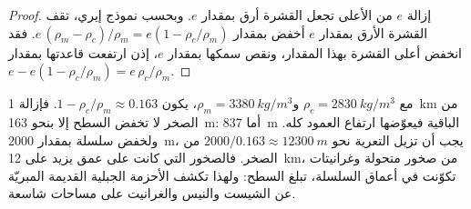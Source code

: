 \begin{proof}
إزالة $e$ من الأعلى تجعل القشرة أرق بمقدار $e$. وبحسب نموذج إيري،
تقف القشرة الأرق بمقدار $e$ أخفض بمقدار $e\,(\rho_m - \rho_c)/\rho_m = e(1 -
\rho_c/\rho_m)$. فقد انخفض أعلى القشرة بهذا المقدار، ونقص
سمكها بمقدار $e$، إذن ارتفعت قاعدتها بمقدار $e - e(1 -
\rho_c/\rho_m) = e\,\rho_c/\rho_m$.
\end{proof}
مع $\rho_c = \qty{2830}{kg/m^3}$ و$\rho_m = \qty{3380}{kg/m^3}$، يكون $1 -
\rho_c/\rho_m \approx 0.163$. فإزالة \qty{1}{km} من الصخر لا تخفض
السطح إلا بنحو \qty{163}{m}: أما \qty{837}{m} الباقية فيعوّضها
ارتفاع العمود كله.
ولخفض سلسلة بمقدار \qty{2000}{m}، يجب أن تزيل التعرية
نحو $2000/0.163 \approx \qty{12300}{m}$ من الصخر. فالصخور التي كانت على عمق
يزيد على \qty{12}{km}، من صخور متحولة وغرانيتات تكوّنت في أعماق
السلسلة، تبلغ السطح: ولهذا تكشف الأحزمة الجبلية القديمة المبريّة
عن الشيست والنيس والغرانيت على مساحات شاسعة.

